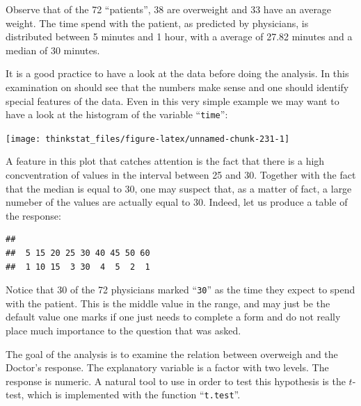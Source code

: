 \documentclass[]{krantz}
\makeatletter
\newenvironment{Shaded}{\begin{snugshade}}{\end{snugshade}}
\newcommand{\KeywordTok}[1]{\textcolor[rgb]{0.13,0.29,0.53}{\textbf{#1}}}
\newcommand{\OperatorTok}[1]{\textcolor[rgb]{0.81,0.36,0.00}{\textbf{#1}}}
\newcommand{\NormalTok}[1]{#1}
\newenvironment{kframe}{%
\medskip{}
\setlength{\fboxsep}{.8em}
 \def\at@end@of@kframe{}%
 \ifinner\ifhmode%
  \def\at@end@of@kframe{\end{minipage}}%
  \begin{minipage}{\columnwidth}%
 \fi\fi%
 \def\FrameCommand##1{\hskip\@totalleftmargin \hskip-\fboxsep
 \colorbox{shadecolor}{##1}\hskip-\fboxsep
     \hskip-\linewidth \hskip-\@totalleftmargin \hskip\columnwidth}%
 \MakeFramed {\advance\hsize-\width
   \@totalleftmargin\z@ \linewidth\hsize
   \@setminipage}}%
 {\par\unskip\endMakeFramed%
 \at@end@of@kframe}
\renewenvironment{Shaded}{\begin{kframe}}{\end{kframe}}
\theoremstyle{definition}
\theoremstyle{definition}
\theoremstyle{definition}
\theoremstyle{remark}
\makeatother
\begin{document}
Observe that of the 72 ``patients'', 38 are overweight and 33 have an
average weight. The time spend with the patient, as predicted by
physicians, is distributed between 5 minutes and 1 hour, with a average
of 27.82 minutes and a median of 30 minutes.

It is a good practice to have a look at the data before doing the
analysis. In this examination on should see that the numbers make sense
and one should identify special features of the data. Even in this very
simple example we may want to have a look at the histogram of the
variable ``\texttt{time}'':

\begin{Shaded}
\end{Shaded}

\begin{center}\texttt{[image: thinkstat\_files/figure-latex/unnamed-chunk-231-1]} \end{center}

A feature in this plot that catches attention is the fact that there is
a high concventration of values in the interval between 25 and 30.
Together with the fact that the median is equal to 30, one may suspect
that, as a matter of fact, a large numeber of the values are actually
equal to 30. Indeed, let us produce a table of the response:

\begin{Shaded}
\end{Shaded}

\begin{verbatim}
## 
##  5 15 20 25 30 40 45 50 60 
##  1 10 15  3 30  4  5  2  1
\end{verbatim}

Notice that 30 of the 72 physicians marked ``\texttt{30}'' as the time
they expect to spend with the patient. This is the middle value in the
range, and may just be the default value one marks if one just needs to
complete a form and do not really place much importance to the question
that was asked.

The goal of the analysis is to examine the relation between overweigh
and the Doctor's response. The explanatory variable is a factor with two
levels. The response is numeric. A natural tool to use in order to test
this hypothesis is the \(t\)-test, which is implemented with the
function ``\texttt{t.test}''.
\end{document}
